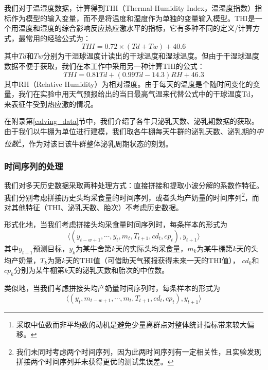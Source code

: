 我们对于温湿度数据，计算得到THI（Thermal-Humidity Index，温湿度指数）指标作为模型的输入变量，而不是将温度和湿度作为单独的变量输入模型。THI是一个用温度和湿度的综合影响反应热应激水平的指标，它有多种不同的定义/计算方式，最常用的经验公式为：
\begin{equation}
	THI=0.72 \times (Td + Tw) + 40.6
\end{equation}
其中$Td$和$Tw$分别为干湿球温度计读出的干球温度和湿球温度。但由于干湿球温度数据不便于获取，我们在本工作中采用另一种计算THI的公式\cite{thi_cow_wang}：
\begin{equation}
	THI=0.81Td + (0.99Td - 14.3)RH + 46.3
\end{equation}
其中RH（Relative Humidity）为相对湿度。由于每天的温度是个随时间变化的变量，我们在实验中用天气预报给出的当日最高气温来代替公式中的干球温度Td，来表征牛受到热应激的情况。

在附录第\ref{calving_data}节中，我们介绍了各牛只泌乳天数、泌乳期数据的获取。由于我们以牛棚为单位进行建模，我们取各牛棚每天牛群的泌乳天数、泌乳期的\emph{中位数}\footnote{采取中位数而非平均数的动机是避免少量离群点对整体统计指标带来较大偏移。}，作为对该日该牛群整体泌乳周期状态的刻划。

\subsubsection{时间序列的处理}
\label{time_series}

我们对多天历史数据采取两种处理方式：直接拼接和提取小波分解的系数作特征。我们分别考虑拼接历史头均采食量的时间序列，或者头均产奶量的时间序列\footnote{我们未同时考虑两个时间序列，因为此两时间序列有一定相关性，且实验发现拼接两个时间序列并未获得更优的测试集误差。}，而对其他特征（THI、泌乳天数、胎次）不考虑历史数据。

形式化地，当我们考虑拼接头均采食量时间序列时，每条样本的形式为
\begin{equation}
	\langle (y_{t-w+1}, \cdots, y_t, m_t, T_{t+1}, cd_{t}, cp_{t}), y_{t+1} \rangle
\end{equation}
	其中$y_{t+1}$预测目标，$y_k$为某牛舍第$k$天的实际头均采食量，$m_k$为某牛棚第$k$天的头均产奶量，$T_{k}$为第$k$天的THI值（可借助天气预报获得未来一天的THI值）， $cd_{k}$和$cp_{k}$分别为某牛棚第$k$天的泌乳天数和胎次的中位数。
	
类似地，当我们考虑拼接头均产奶量时间序列时，每条样本的形式为
\begin{equation}
	\langle (y_t, m_{t-w+1}, \cdots, m_t, T_{t+1}, cd_{t}, cp_{t}), y_{t+1} \rangle
\end{equation}

